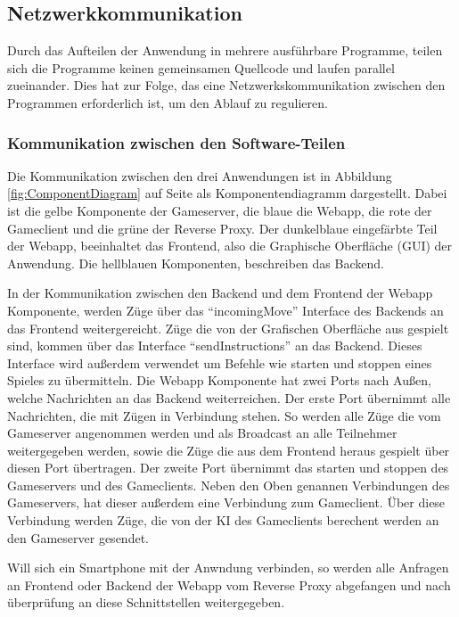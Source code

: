 \documentclass[12pt,a4paper,bibliography=totocnumbered,listof=totocnumbered]{article}
\begin{document}
\subsection{Netzwerkkommunikation}
Durch das Aufteilen der Anwendung in mehrere ausführbare Programme, teilen sich die Programme keinen gemeinsamen Quellcode und laufen parallel zueinander. 
Dies hat zur Folge, das eine Netzwerkskommunikation zwischen den Programmen erforderlich ist, um den Ablauf zu regulieren.

\subsubsection{Kommunikation zwischen den Software-Teilen}
Die Kommunikation zwischen den drei Anwendungen ist in Abbildung \ref{fig:ComponentDiagram} auf Seite \pageref{fig:ComponentDiagram} als 
Komponentendiagramm dargestellt. Dabei ist die gelbe Komponente der Gameserver, die blaue die Webapp, die rote der Gameclient und die grüne der Reverse Proxy.
Der dunkelblaue eingefärbte Teil der Webapp, beeinhaltet das Frontend, also die Graphische Oberfläche (GUI) der Anwendung.
Die hellblauen Komponenten, beschreiben das Backend. 

In der Kommunikation zwischen den Backend und dem Frontend der Webapp Komponente, werden Züge über das ``incomingMove'' Interface des Backends an das Frontend
weitergereicht. Züge die von der Grafischen Oberfläche aus gespielt sind, kommen über das Interface ``sendInstructions'' an das Backend. Dieses
Interface wird außerdem verwendet um Befehle wie starten und stoppen eines Spieles zu übermitteln. Die Webapp Komponente hat zwei Ports nach Außen, 
welche Nachrichten an das Backend
weiterreichen. Der erste Port übernimmt alle Nachrichten, die mit Zügen in Verbindung stehen. So werden alle Züge die vom Gameserver angenommen werden
und als Broadcast an alle Teilnehmer weitergegeben werden, sowie die Züge die aus dem Frontend heraus gespielt über diesen Port übertragen.
Der zweite Port übernimmt das starten und stoppen des Gameservers und des Gameclients. 
Neben den Oben genannen Verbindungen des Gameservers, hat dieser außerdem eine Verbindung zum Gameclient. Über diese Verbindung werden Züge, die von der 
KI des Gameclients berechent werden an den Gameserver gesendet.

Will sich ein Smartphone mit der Anwndung verbinden, so werden alle Anfragen an Frontend oder Backend der Webapp vom Reverse Proxy abgefangen und 
nach überprüfung an diese Schnittstellen weitergegeben.
\end{document}
